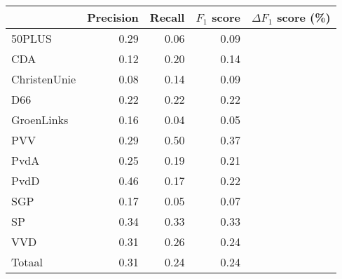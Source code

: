 \begin{tabular}{lrrrr}
\toprule
{} &  Precision &  Recall &  $F_1$ score &  $\Delta F_1$ score (\%) \\
\midrule
50PLUS       &       0.29 &    0.06 &      0.09 &           \\
CDA          &       0.12 &    0.20 &      0.14 &          \\
ChristenUnie &       0.08 &    0.14 &      0.09 &           \\
D66          &       0.22 &    0.22 &      0.22 &          \\
GroenLinks   &       0.16 &    0.04 &      0.05 &          \\
PVV          &       0.29 &    0.50 &      0.37 &          \\
PvdA         &       0.25 &    0.19 &      0.21 &          \\
PvdD         &       0.46 &    0.17 &      0.22 &          \\
SGP          &       0.17 &    0.05 &      0.07 &           \\
SP           &       0.34 &    0.33 &      0.33 &          \\
VVD          &       0.31 &    0.26 &      0.24 &          \\
\midrule
Totaal       &       0.31 &    0.24 &      0.24 &         \\
\bottomrule
\end{tabular}

